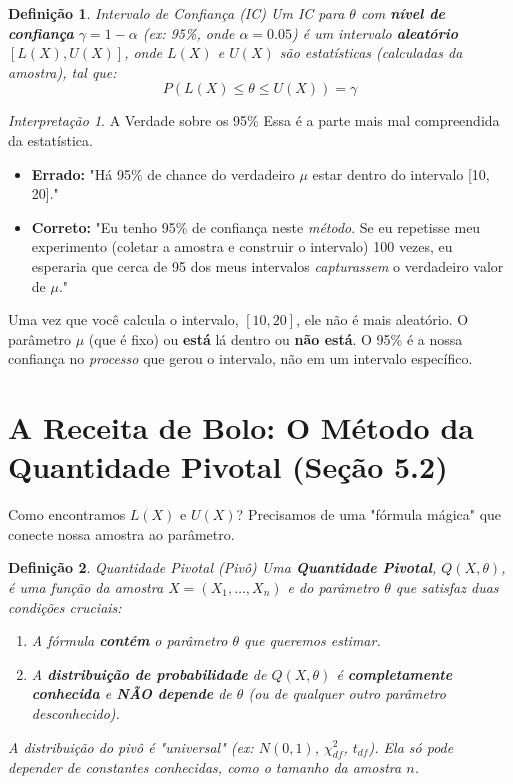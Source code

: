 \documentclass[12pt, a4paper]{article}
\newtheorem{definicao}{Definição}[section]
\theoremstyle{definition} %
\theoremstyle{remark} %
\newtheorem{interpretacao}{Interpretação}[section]
\begin{document}
\begin{definicao}{Intervalo de Confiança (IC)}
    Um IC para $\theta$ com \textbf{nível de confiança} $\gamma = 1-\alpha$ (ex: 95\%, onde $\alpha=0.05$) é um intervalo \textbf{aleatório} $[L(X), U(X)]$, onde $L(X)$ e $U(X)$ são estatísticas (calculadas da amostra), tal que:
    $$ P(L(X) \le \theta \le U(X)) = \gamma $$
\end{definicao}

\begin{interpretacao}{A Verdade sobre os 95\%}
    Essa é a parte mais mal compreendida da estatística.
    \begin{itemize}
        \item \textbf{Errado:} "Há 95\% de chance do verdadeiro $\mu$ estar dentro do intervalo [10, 20]."
        \item \textbf{Correto:} "Eu tenho 95\% de confiança neste \textit{método}. Se eu repetisse meu experimento (coletar a amostra e construir o intervalo) 100 vezes, eu esperaria que cerca de 95 dos meus intervalos \textit{capturassem} o verdadeiro valor de $\mu$."
    \end{itemize}
    Uma vez que você calcula o intervalo, $[10, 20]$, ele não é mais aleatório. O parâmetro $\mu$ (que é fixo) ou \textbf{está} lá dentro ou \textbf{não está}. O 95\% é a nossa confiança no \textit{processo} que gerou o intervalo, não em um intervalo específico.
\end{interpretacao}

\newpage
\section{A Receita de Bolo: O Método da Quantidade Pivotal (Seção 5.2)}

Como encontramos $L(X)$ e $U(X)$? Precisamos de uma "fórmula mágica" que conecte nossa amostra ao parâmetro.

\begin{definicao}{Quantidade Pivotal (Pivô)}
    Uma \textbf{Quantidade Pivotal}, $Q(X, \theta)$, é uma função da amostra $X = (X_1, \dots, X_n)$ e do parâmetro $\theta$ que satisfaz duas condições \textit{cruciais}:
    \begin{enumerate}
        \item A fórmula \textbf{contém} o parâmetro $\theta$ que queremos estimar.
        \item A \textbf{distribuição de probabilidade} de $Q(X, \theta)$ é \textbf{completamente conhecida} e \textbf{NÃO depende} de $\theta$ (ou de qualquer outro parâmetro desconhecido).
    \end{enumerate}
    A distribuição do pivô é "universal" (ex: $N(0,1)$, $\chi^2_{df}$, $t_{df}$). Ela só pode depender de constantes conhecidas, como o tamanho da amostra $n$.
\end{definicao}
\end{document}
